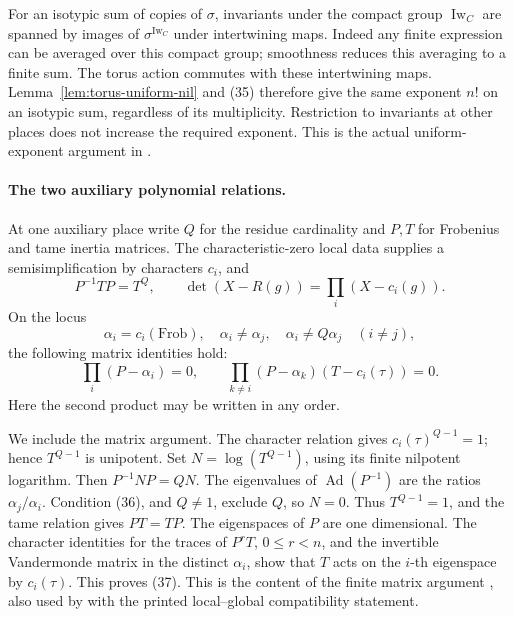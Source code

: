 For an isotypic sum of copies of $\sigma$, invariants under the
compact group $\operatorname{Iw}_C$ are spanned by images of
$\sigma^{\operatorname{Iw}_C}$ under intertwining maps.
Indeed any finite expression can be averaged over this compact
group; smoothness reduces this averaging to a finite sum.
The torus action commutes with these intertwining maps.
Lemma~\ref{lem:torus-uniform-nil} and (35) therefore give the
same exponent $n!$ on an isotypic sum, regardless of its
multiplicity.  Restriction to invariants at other places
does not increase the required exponent.
This is the actual uniform-exponent argument in
.

\paragraph{The two auxiliary polynomial relations.}
At one auxiliary place write $Q$ for the residue cardinality
and $P,T$ for Frobenius and tame inertia matrices.
The characteristic-zero local data supplies a semisimplification
by characters $c_i$, and
\[
 P^{-1}TP=T^Q,\qquad
 \det(X-R(g))=\prod_i(X-c_i(g)).
\]
On the locus
\[
         \alpha_i=c_i(\mathrm{Frob}),\quad
         \alpha_i\ne\alpha_j,\quad
         \alpha_i\ne Q\alpha_j\quad(i\ne j),                    \tag{36}
\]
the following matrix identities hold:
\[
 \prod_i(P-\alpha_i)=0,\qquad
 \prod_{k\ne i}(P-\alpha_k)
                    (T-c_i(\tau))=0.                          \tag{37}
\]
Here the second product may be written in any order.

We include the matrix argument.
The character relation gives $c_i(\tau)^{Q-1}=1$; hence
$T^{Q-1}$ is unipotent.
Set $N=\log(T^{Q-1})$, using its finite nilpotent logarithm.
Then $P^{-1}NP=QN$.
The eigenvalues of $\operatorname{Ad}(P^{-1})$ are the ratios
$\alpha_j/\alpha_i$.  Condition (36), and $Q\ne1$, exclude $Q$,
so $N=0$.  Thus $T^{Q-1}=1$, and the tame relation gives $PT=TP$.
The eigenspaces of $P$ are one dimensional.
The character identities for the traces of $P^rT$,
$0\leq r<n$, and the invertible Vandermonde matrix in the
distinct $\alpha_i$, show that $T$ acts on the $i$-th
eigenspace by $c_i(\tau)$.  This proves (37).
This is the content of the finite matrix argument
, also used by
 with the printed local--global
compatibility statement.

